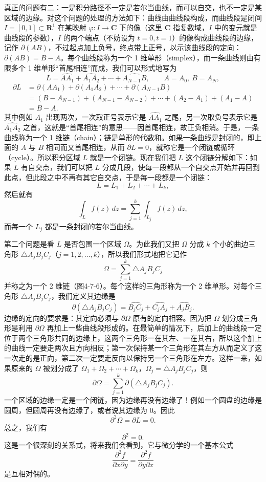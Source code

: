 真正的问题有二：一是积分路径不一定是若尔当曲线，而可以自交，也不一定是某区域的边缘。对这个问题的处理的方法如下：曲线由曲线段构成，而曲线段是闭间 $I=[0,1]\subset\mathbf R^1$ 在某映射 $\varphi:I\to\mathbf C$ 下的像（这里 $\mathbf C$ 指复数域，$I$ 中的变元就是曲线段的参数），$I$ 的两个端点（不妨设为 $t=0,t=1$）的像构成曲线段的边缘，记作 $\partial(AB)$，不过起点加上负号，终点带上正号，以示该曲线段的定向：$\partial(AB)=B-A$。每个曲线段称为一个 1 维单形（simplex），而一条曲线则由有限多个 1 维单形“首尾相连”而成，我们可以形式地写为
\[
 L=\widehat{AA_1}+\widehat{A_1A_2}+\cdots+\widehat{A_{N-1}B},\qquad A=A_0,\ B=A_N,
\]
\[
\begin{aligned}
 \partial L
 &=\partial(AA_1)+\partial(A_1A_2)+\cdots+\partial(A_{N-1}B)\\
 &=(B-A_{N-1})+(A_{N-1}-A_{N-2})+\cdots+(A_2-A_1)+(A_1-A)\\
 &=B-A.
\end{aligned}
\]
其中例如 $A_1$ 出现两次，一次取正号表示它是 $\widehat{AA_1}$ 之尾，另一次取负号表示它是 $\widehat{A_1A_2}$ 之首，这就是“首尾相连”的意思——因首尾相连，故正负相消。于是，一条曲线称为一个 1 维链（chain）；链是单形的代数和。如果一条曲线是封闭的，即上面的 $A$ 与 $B$ 相同而又首尾相连，从而 $\partial L=0$，就称它是一个闭链或循环（cycle）。所以积分区域 $L$ 就是一个闭链。现在我们把 $L$ 这个闭链分解如下：如果 $L$ 有自交点，我们可以把 $L$ 分成几段，使每一段都从一个自交点开始并再回到此点，但此段之中不再有其它自交点，于是每一段都是一个闭链：
\[
 L=L_1+L_2+\cdots+L_k,
\]
然后就有
\[
 \int_L f(z)\,dz=\sum_{j=1}^k\int_{L_j}f(z)\,dz,
\]
而每一个 $L_j$ 都是一条封闭的若尔当曲线。

第二个问题是看 $L$ 是否包围一个区域 $\Omega$。为此我们又把 $\Omega$ 分成 $k$ 个小的曲边三角形 $\triangle A_jB_jC_j$（$j=1,2,\ldots,k$），所以我们形式地把它记作
\[
 \Omega=\sum_{j=1}^k\triangle A_jB_jC_j
\]
并称之为一个 2 维链（图4-7-6）。每个这样的三角形称为一个 2 维单形。对每个三角形 $\triangle A_jB_jC_j$，我们定义其边缘是
\[
 \partial(\triangle A_jB_jC_j)
 =\widehat{B_jC_j}+\widehat{C_jA_j}+\widehat{A_jB_j}.
\]
边缘的定向的要求是：其定向必须与 $\partial\Omega$ 原有的定向相容。因为把 $\Omega$ 划分成三角形是利用 $\partial\Omega$ 再加上一些曲线段形成的。在最简单的情况下，后加上的曲线段一定位于两个三角形共同的边缘上，这两个三角形一在其左、一在其右，所以这个加上的曲线一定要走两次且方向相反；第一次保持某一个三角形在其左方从而定义了这一次走的是正向，第二次一定要走反向以保持另一个三角形在左方。这样一来，如果原来的 $\Omega$ 被划分成了 $\Omega_1+\Omega_2+\cdots+\Omega_k$，$\Omega_j=\triangle A_jB_jC_j$，则
\[
 \partial\Omega=\sum_{j=1}^k\partial(\triangle A_jB_jC_j).
\]
一个区域的边缘一定是一个闭链，因为边缘再没有边缘了！例如一个圆盘的边缘是圆周，但圆周再没有边缘了，或者说其边缘为 0。因此
\[
 \partial^2\Omega=\partial L=0.
\]
总之，我们有
\[
 \partial^2=0.
\]
这是一个很深刻的关系式，将来我们会看到，它与微分学的一个基本公式
\[
 \frac{\partial^2f}{\partial x\partial y}=\frac{\partial^2f}{\partial y\partial x}
\]
是互相对偶的。

